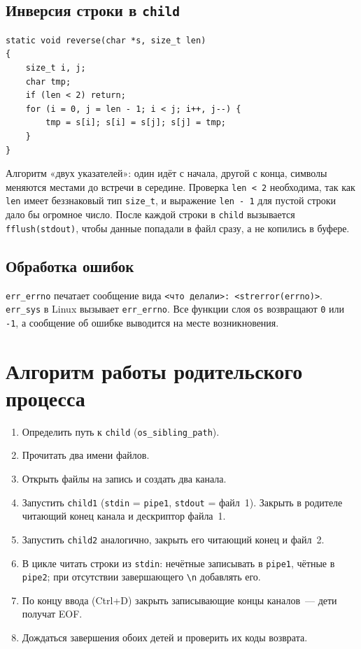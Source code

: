 \documentclass[11pt, a4paper]{article}
\begin{document}
\subsection{Инверсия строки в \texttt{child}}

\begin{lstlisting}
static void reverse(char *s, size_t len)
{
    size_t i, j;
    char tmp;
    if (len < 2) return;
    for (i = 0, j = len - 1; i < j; i++, j--) {
        tmp = s[i]; s[i] = s[j]; s[j] = tmp;
    }
}
\end{lstlisting}

Алгоритм «двух указателей»: один идёт с начала, другой с конца, символы
меняются местами до встречи в середине. Проверка \texttt{len < 2} необходима,
так как \texttt{len} имеет беззнаковый тип \texttt{size\_\allowbreak{}t}, и выражение
\texttt{len - 1} для пустой строки дало бы огромное число. После каждой
строки в \texttt{child} вызывается \texttt{fflush(stdout)}, чтобы данные
попадали в файл сразу, а не копились в буфере.

\subsection{Обработка ошибок}

\texttt{err\_\allowbreak{}errno} печатает сообщение вида
\texttt{<что делали>: <strerror(errno)>}. \texttt{err\_\allowbreak{}sys} в Linux
вызывает \texttt{err\_\allowbreak{}errno}. Все функции слоя \texttt{os} возвращают
\texttt{0} или \texttt{-1}, а сообщение об ошибке выводится на месте возникновения.

\section{Алгоритм работы родительского процесса}

\begin{enumerate}
  \item Определить путь к \texttt{child} (\texttt{os\_\allowbreak{}sibling\_\allowbreak{}path}).
  \item Прочитать два имени файлов.
  \item Открыть файлы на запись и создать два канала.
  \item Запустить \texttt{child1} (\texttt{stdin} = \texttt{pipe1}, \texttt{stdout} = файл~1).
        Закрыть в родителе читающий конец канала и дескриптор файла~1.
  \item Запустить \texttt{child2} аналогично, закрыть его читающий конец и файл~2.
  \item В цикле читать строки из \texttt{stdin}: нечётные записывать в
        \texttt{pipe1}, чётные в \texttt{pipe2}; при отсутствии завершающего
        \texttt{\textbackslash n} добавлять его.
  \item По концу ввода (Ctrl+D) закрыть
        записывающие концы каналов~--- дети получат EOF.
  \item Дождаться завершения обоих детей и проверить их коды возврата.
\end{enumerate}
\end{document}
